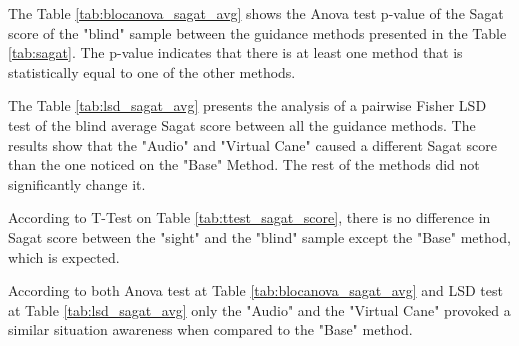 \begin{table}[!htb]
    \begin{minipage}{.45\linewidth}
        
    \end{minipage}
    \hfill
    \begin{minipage}{.45\linewidth}
        \vspace{-2.75cm}
        
    \end{minipage}
\end{table}

The Table \ref{tab:blocanova_sagat_avg} shows the Anova test p-value of the Sagat score of the "blind" sample between the guidance methods presented in the Table \ref{tab:sagat}. The p-value indicates that there is at least one method that is statistically equal to one of the other methods.



The Table \ref{tab:lsd_sagat_avg} presents the analysis of a pairwise Fisher LSD test of the blind average Sagat score between all the guidance methods. The results show that the "Audio" and "Virtual Cane" caused a different Sagat score than the one noticed on the "Base" Method. The rest of the methods did not significantly change it.



According to T-Test on Table \ref{tab:ttest_sagat_score}, there is no difference in Sagat score between the "sight" and the "blind" sample except the "Base" method, which is expected.

According to both Anova test at Table \ref{tab:blocanova_sagat_avg} and LSD test at Table \ref{tab:lsd_sagat_avg} only the "Audio"  and the "Virtual Cane" provoked a similar situation awareness when compared to the "Base" method.





\FloatBarrier